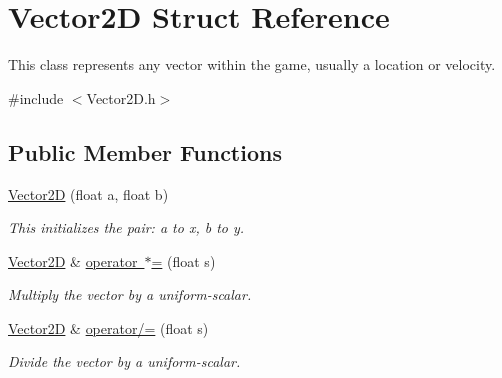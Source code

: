 \hypertarget{struct_vector2_d}{}\section{Vector2D Struct Reference}
\label{struct_vector2_d}


This class represents any vector within the game, usually a location or velocity.  




{\ttfamily \#include $<$Vector2\+D.\+h$>$}

\subsection*{Public Member Functions}
\begin{DoxyCompactItemize}
\item 
\mbox{\label{struct_vector2_d_ab34332f542a2eef92e4a52548f753587}} 
\mbox{\hyperlink{struct_vector2_d_ab34332f542a2eef92e4a52548f753587}{Vector2D}} (float a, float b)
\begin{DoxyCompactList}\small\item\em This initializes the pair\+: a to x, b to y. \end{DoxyCompactList}\item 
\mbox{\label{struct_vector2_d_af75f0c2415a06d5b6354e5e4e2a69853}} 
\mbox{\hyperlink{struct_vector2_d}{Vector2D}} \& \mbox{\hyperlink{struct_vector2_d_af75f0c2415a06d5b6354e5e4e2a69853}{operator $\ast$=}} (float s)
\begin{DoxyCompactList}\small\item\em Multiply the vector by a uniform-\/scalar. \end{DoxyCompactList}\item 
\mbox{\label{struct_vector2_d_a67ec8060777ff375c822932b37ecdef6}} 
\mbox{\hyperlink{struct_vector2_d}{Vector2D}} \& \mbox{\hyperlink{struct_vector2_d_a67ec8060777ff375c822932b37ecdef6}{operator/=}} (float s)
\begin{DoxyCompactList}\small\item\em Divide the vector by a uniform-\/scalar. \end{DoxyCompactList}\item 
\mbox{\label{struct_vector2_d_af989648a18dc7969643c2b3471456638}} 

\end{DoxyCompactItemize}
